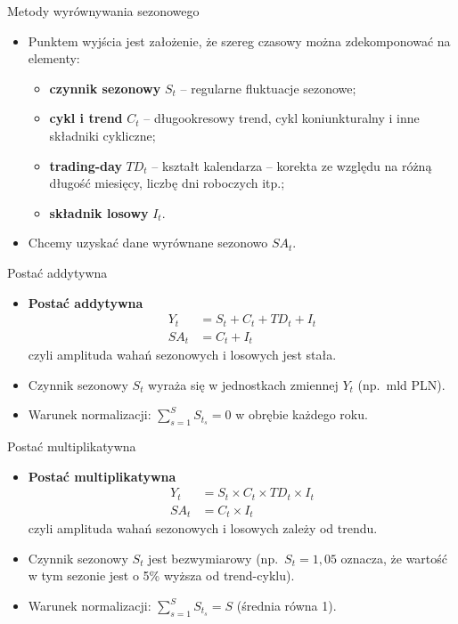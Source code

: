 \documentclass[11pt,usenames,dvipsnames,aspectratio=169]{beamer}
\begin{document}
\begin{frame}{Metody wyrównywania sezonowego}
\begin{itemize}
    \item Punktem wyjścia jest założenie, że szereg czasowy można zdekomponować na elementy:
    \begin{itemize}
        \item \textbf{czynnik sezonowy} $S_{t}$ -- regularne fluktuacje sezonowe;
        \item \textbf{cykl i trend} $C_{t}$ -- długookresowy trend, cykl koniunkturalny i inne składniki cykliczne;
        \item \textbf{trading-day} $TD_{t}$ -- kształt kalendarza -- korekta ze względu na różną długość miesięcy, liczbę dni roboczych itp.;
        \item \textbf{składnik losowy} $I_{t}$.
    \end{itemize}
    \item Chcemy uzyskać dane wyrównane sezonowo $SA_{t}$.
\end{itemize}
\end{frame}

\begin{frame}{Postać addytywna}
\begin{itemize}
    \item \textbf{Postać addytywna}
    \begin{align*}
    Y_{t} & =S_{t}+C_{t}+TD_{t}+I_{t}\\
    SA_{t} & =C_{t}+I_{t}
    \end{align*}
    czyli amplituda wahań sezonowych i losowych jest stała.
    \item Czynnik sezonowy $S_t$ wyraża się w jednostkach zmiennej $Y_t$ (np.\ mld PLN).
    \item Warunek normalizacji: $\sum_{s=1}^{S}S_{t_s}=0$ w obrębie każdego roku.
\end{itemize}
\end{frame}

\begin{frame}{Postać multiplikatywna}
\begin{itemize}
    \item \textbf{Postać multiplikatywna}
    \begin{align*}
    Y_{t} & =S_{t}\times C_{t}\times TD_{t}\times I_{t}\\
    SA_{t} & =C_{t}\times I_{t}
    \end{align*}
    czyli amplituda wahań sezonowych i losowych zależy od trendu.
    \item Czynnik sezonowy $S_t$ jest bezwymiarowy (np.\ $S_t=1{,}05$ oznacza, że wartość w tym sezonie jest o 5\% wyższa od trend-cyklu).
    \item Warunek normalizacji: $\sum_{s=1}^{S}S_{t_s}=S$ (średnia równa 1).
\end{itemize}
\end{frame}
\end{document}
